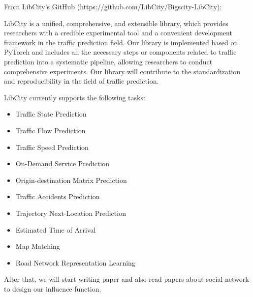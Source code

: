 \documentclass[fontset=none]{ctexart}
\theoremstyle{definition}
\theoremstyle{remark}
\begin{document}
From LibCity's GitHub (https://github.com/LibCity/Bigscity-LibCity):

LibCity is a unified, comprehensive, and extensible library, which provides researchers with a credible experimental tool and a convenient development framework in the traffic prediction field. Our library is implemented based on PyTorch and includes all the necessary steps or components related to traffic prediction into a systematic pipeline, allowing researchers to conduct comprehensive experiments. Our library will contribute to the standardization and reproducibility in the field of traffic prediction.

LibCity currently supports the following tasks:
\begin{itemize}
  \item Traffic State Prediction
  \item Traffic Flow Prediction
  \item Traffic Speed Prediction
  \item On-Demand Service Prediction
  \item Origin-destination Matrix Prediction
  \item Traffic Accidents Prediction
  \item Trajectory Next-Location Prediction
  \item Estimated Time of Arrival
  \item Map Matching
  \item Road Network Representation Learning
\end{itemize}

After that, we will start writing paper and also read papers about social network to design our influence function.

% 
% 
\end{document}

